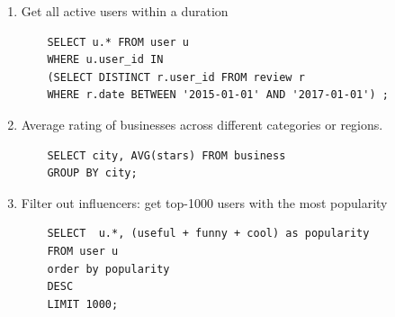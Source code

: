 \documentclass[runningheads]{llncs}
\begin{document}
\begin{enumerate}
    \item Get all active users within a duration
    \begin{verbatim}
    SELECT u.* FROM user u 
    WHERE u.user_id IN 
    (SELECT DISTINCT r.user_id FROM review r 
    WHERE r.date BETWEEN '2015-01-01' AND '2017-01-01') ;
    \end{verbatim}

    \item Average rating of businesses across different categories or regions.
    \begin{verbatim}
    SELECT city, AVG(stars) FROM business 
    GROUP BY city; 
    \end{verbatim}

    \item Filter out influencers: get top-1000 users with the most popularity
    \begin{verbatim}
    SELECT  u.*, (useful + funny + cool) as popularity 
    FROM user u 
    order by popularity 
    DESC
    LIMIT 1000;
\end{verbatim}


\end{enumerate}
\end{document}
